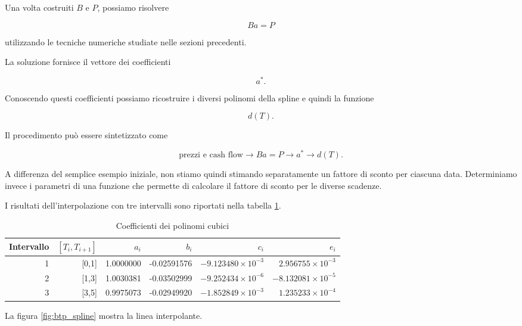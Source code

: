 Una volta costruiti $B$ e $P$, possiamo risolvere

\begin{equation*}
    Ba=P
\end{equation*}

utilizzando le tecniche numeriche studiate nelle sezioni precedenti.

La soluzione fornisce il vettore dei coefficienti

\begin{equation*}
    a^*.
\end{equation*}

Conoscendo questi coefficienti possiamo ricostruire i diversi
polinomi della spline e quindi la funzione

\begin{equation*}
    d(T).
\end{equation*}

Il procedimento può essere sintetizzato come

\begin{equation*}
\text{prezzi e cash flow}
\longrightarrow
Ba=P
\longrightarrow
a^*
\longrightarrow
d(T).
\end{equation*}

A differenza del semplice esempio iniziale, non stiamo quindi
stimando separatamente un fattore di sconto per ciascuna data.
Determiniamo invece i parametri di una funzione che permette di
calcolare il fattore di sconto per le diverse scadenze.

I risultati dell'interpolazione con tre intervalli sono riportati nella tabella \ref{tab:coefficienti_cubici}.

\begin{table}[htbp]
\centering
\caption{Coefficienti dei polinomi cubici}
\label{tab:coefficienti_cubici}
\begin{tabular}{rrrrrr}
\toprule
Intervallo & $[T_i,T_{i+1}]$ & $a_i$ & $b_i$ & $c_i$ & $e_i$ \\
\midrule
1 & [0,1] &1.0000000 & -0.02591576 & $-9.123480 \times 10^{-3}$ & $2.956755 \times 10^{-3}$ \\
2 & [1,3] &1.0030381 & -0.03502999 & $-9.252434 \times 10^{-6}$ & $-8.132081 \times 10^{-5}$ \\
3 & [3,5] &0.9975073 & -0.02949920 & $-1.852849 \times 10^{-3}$ & $1.235233 \times 10^{-4}$ \\
\bottomrule
\end{tabular}
\end{table}

La figura \ref{fig:btp_spline} mostra la linea interpolante.

